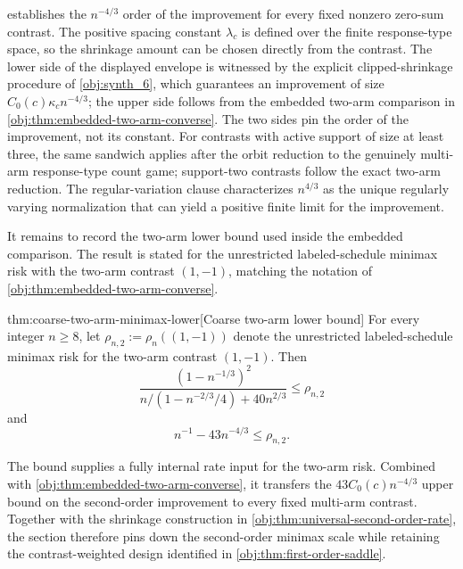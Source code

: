  establishes the \(n^{-4/3}\) order of the improvement for every fixed nonzero zero-sum contrast. The positive spacing constant \(\lambda_c\) is defined over the finite response-type space, so the shrinkage amount can be chosen directly from the contrast. The lower side of the displayed envelope is witnessed by the explicit clipped-shrinkage procedure of \cref{obj:synth_6}, which guarantees an improvement of size \(C_0(c)\kappa_c n^{-4/3}\); the upper side follows from the embedded two-arm comparison in \cref{obj:thm:embedded-two-arm-converse}. The two sides pin the order of the improvement, not its constant. For contrasts with active support of size at least three, the same sandwich applies after the orbit reduction to the genuinely multi-arm response-type count game; support-two contrasts follow the exact two-arm reduction. The regular-variation clause characterizes \(n^{4/3}\) as the unique regularly varying normalization that can yield a positive finite limit for the improvement.

It remains to record the two-arm lower bound used inside the embedded comparison. The result is stated for the unrestricted labeled-schedule minimax risk with the two-arm contrast \((1,-1)\), matching the notation of \cref{obj:thm:embedded-two-arm-converse}.

\begin{theoremv}{thm:coarse-two-arm-minimax-lower}[Coarse two-arm lower bound]
For every integer \(n\ge 8\), let \(\rho_{n,2}:=\rho_n((1,-1))\) denote the unrestricted labeled-schedule minimax risk for the two-arm contrast \((1,-1)\). Then
\[
\frac{(1-n^{-1/3})^2}
{n/(1-n^{-2/3}/4)+40n^{2/3}}
\le \rho_{n,2}
\]
and
\[
n^{-1}-43n^{-4/3}\le \rho_{n,2}.
\]
\end{theoremv}

The bound supplies a fully internal rate input for the two-arm risk. Combined with \cref{obj:thm:embedded-two-arm-converse}, it transfers the \(43C_0(c)n^{-4/3}\) upper bound on the second-order improvement to every fixed multi-arm contrast. Together with the shrinkage construction in \cref{obj:thm:universal-second-order-rate}, the section therefore pins down the second-order minimax scale while retaining the contrast-weighted design identified in \cref{obj:thm:first-order-saddle}.
